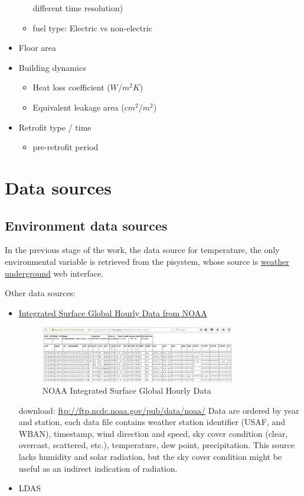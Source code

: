 \documentclass[12pt]{article}
\begin{document}
\begin{itemize}
\begin{itemize}
    different time resolution)
  \item fuel type: Electric vs non-electric ~\cite{Yu20101637}
  \end{itemize}
\item Floor area~\cite{Yu20101637}
\item Building dynamics
  \begin{itemize}
  \item Heat loss coefficient ($W / m^2K$)~\cite{Yu20101637}
  \item Equivalent leakage area ($cm^2 / m^2$)~\cite{Yu20101637}
  \end{itemize}
\item Retrofit type / time
  \begin{itemize}
  \item pre-retrofit period~\cite{kissock2008methodology}
  \end{itemize}
\end{itemize}
\section{Data sources}
\subsection{Environment data sources}
In the previous stage of the work, the data source for temperature,
the only environmental variable is retrieved from the pisystem, whose
source is \href{https://www.wunderground.com/}{weather
  underground} web interface. 

Other data sources:
\begin{itemize}
\item \href{https://gis.ncdc.noaa.gov/geoportal/catalog/search/resource/details.page?id=gov.noaa.ncdc:C00532}{Integrated Surface Global Hourly Data from NOAA}
  \begin{figure}[h!]
    \centering
    \includegraphics[width=0.8\textwidth]{images/noaa_ish.png}
    \caption{NOAA Integrated Surface Global Hourly Data}
    \label{fig:noaa_ish}
  \end{figure}
  download: \url{ftp://ftp.ncdc.noaa.gov/pub/data/noaa/} Data are
  ordered by year and station, each data file contains weather station
  identifier (USAF, and WBAN), timestamp, wind direction and speed,
  sky cover condition (clear, overcast, scattered, etc.), temperature,
  dew point, precipitation. This source lacks humidity and solar
  radiation, but the sky cover condition might be useful as an
  indirect indication of radiation.
  

\item LDAS
\end{itemize}
\end{document}
